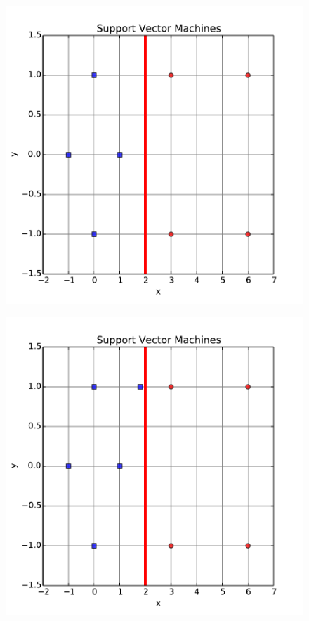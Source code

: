 \begin{figure}[!h]
\centering
\begin{minipage}{.5\textwidth}
  \centering
  \includegraphics[width=\linewidth]{progs/1a.pdf}
  \label{fig:1a}
\end{minipage}%
\begin{minipage}{.5\textwidth}
  \centering
  \includegraphics[width=\linewidth]{progs/1b.pdf}
  \label{fig:1b}
\end{minipage}
\end{figure}

